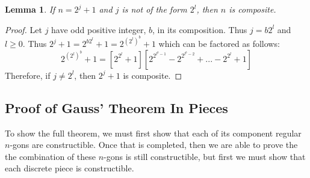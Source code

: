 \documentclass[reqno]{amsart}
\newtheorem{lemma}[theorem]{Lemma}
\theoremstyle{definition}
\numberwithin{equation}{section}
\begin{document}
\begin{lemma}\label{lem:3}
If $n = 2^j + 1$ and $j$ is not of the form $2^l$, then $n$ is composite.
\end{lemma}
\begin{proof}
Let $j$ have odd positive integer, $b$, in its composition. Thus $j = b2^l$ and $l \geq 0$. Thus $2^j + 1 = 2^{b2^l} + 1 = 2^{(2^l)^b} + 1$ which can be factored as follows: $$2^{(2^l)^b} + 1 = [2^{2^l} + 1][2^{2^{l^b-1}} - 2^{2^{l^b-2}} +  ... - 2^{2^l} + 1]$$
Therefore, if $j \neq 2^l$, then $2^j + 1$ is composite.
\end{proof}

\subsection{Proof of Gauss' Theorem In Pieces}

To show the full theorem, we must first show that each of its component regular $n$-gons are constructible. Once that is completed, then we are able to prove the the combination of these $n$-gons is still constructible, but first we must show that each discrete piece is constructible.
\end{document}
